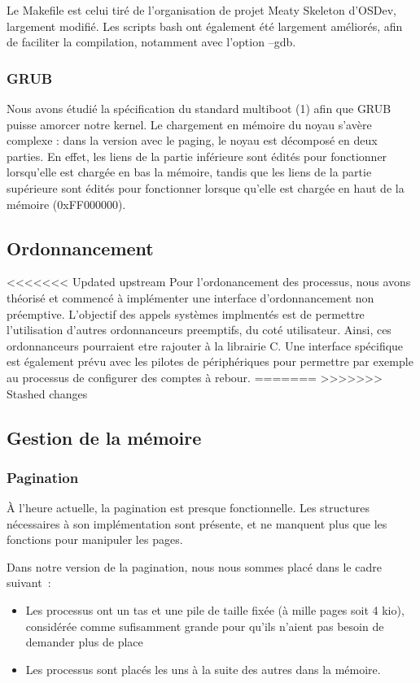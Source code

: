 \documentclass[a4paper, 11pt, twoside]{article}
\begin{document}
Le Makefile est celui tiré de l'organisation de projet Meaty Skeleton d'OSDev,
largement modifié.
Les scripts bash ont également été largement améliorés, afin de faciliter la 
compilation, notamment avec l'option --gdb.

\subsubsection{GRUB}

Nous avons étudié la spécification du standard multiboot (1) afin que GRUB puisse
amorcer notre kernel. Le chargement en mémoire du noyau s'avère complexe : dans la
 version avec le paging, le noyau est décomposé en deux parties. En effet, les liens
 de la partie inférieure sont édités pour fonctionner lorsqu'elle est chargée en bas 
 la mémoire, tandis que les liens de la partie supérieure sont édités pour fonctionner
 lorsque qu'elle est chargée en haut de la mémoire (0xFF000000).

\subsection{Ordonnancement}


<<<<<<< Updated upstream
Pour l'ordonancement des processus, nous avons théorisé et commencé à
implémenter une interface d'ordonnancement non préemptive. L'objectif des appels
systèmes implmentés est de permettre l'utilisation d'autres ordonnanceurs
preemptifs, du coté utilisateur. Ainsi, ces ordonnanceurs pourraient etre
rajouter à la librairie C.
Une interface spécifique est également prévu avec les pilotes de périphériques
pour permettre par exemple au processus de configurer des comptes à rebour.
=======
>>>>>>> Stashed changes

\subsection{Gestion de la mémoire}

\subsubsection{Pagination}

À l'heure actuelle, la pagination est presque fonctionnelle. Les structures
nécessaires à son implémentation sont présente, et ne manquent plus que les
fonctions pour manipuler les pages.

Dans notre version de la pagination, nous nous sommes placé dans le cadre
suivant~:
\begin{itemize}
  \item Les processus ont un tas et une pile de taille fixée (à mille pages soit
    4 kio), considérée comme sufisamment grande pour qu'ils n'aient pas besoin
    de demander plus de place
  \item Les processus sont placés les uns à la suite des autres dans la mémoire.
\end{itemize}
\end{document}
